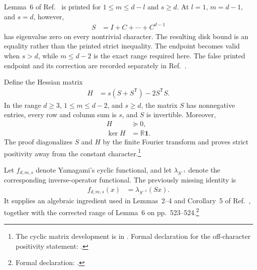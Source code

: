 \documentclass{article}
\begin{document}
Lemma~6 of Ref.~\cite[pp.~523--524]{Yamagami1993Cyclic} is printed for
$1\leq m\leq d-l$ and $s\geq d$. At $l=1$, $m=d-1$, and $s=d$, however,
\begin{align}
    S
        &=I+C+\cdots+C^{d-1}
    \label{eq:wolf_ex3_1_choi_positivity_subcase_scope_false_endpoint_matrix}
\end{align}
has eigenvalue zero on every nontrivial character. The resulting disk bound is
an equality rather than the printed strict inequality. The endpoint becomes
valid when $s>d$, while $m\leq d-2$ is the exact range required here. The
false printed endpoint and its correction are recorded separately in
Ref.~\cite{gap:yamagami_lemma6_endpoint}.

Define the Hessian matrix
\begin{align}
    H
        &=s(S+S^{\mathsf T})-2S^{\mathsf T}S.
    \label{eq:wolf_ex3_1_choi_positivity_subcase_scope_hessian_matrix}
\end{align}
In the range $d\geq 3$, $1\leq m\leq d-2$, and $s\geq d$, the matrix $S$ has
nonnegative entries, every row and column sum is $s$, and $S$ is invertible.
Moreover,
\begin{align}
    H
        &\succeq 0,
    \label{eq:wolf_ex3_1_choi_positivity_subcase_scope_hessian_positive}\\
    \ker H
        &=\mathbb R\mathbf 1.
    \label{eq:wolf_ex3_1_choi_positivity_subcase_scope_hessian_kernel}
\end{align}
The proof diagonalizes $S$ and $H$ by the finite Fourier transform and proves
strict positivity away from the constant character.\footnote{The cyclic
matrix development is in
. Formal declaration for the
off-character positivity statement:
.}

Let $f_{d,m,s}$ denote Yamagami's cyclic functional, and let
$\lambda_{S^{-1}}$ denote the corresponding inverse-operator functional. The
previously missing identity is
\begin{align}
    f_{d,m,s}(x)
        &=\lambda_{S^{-1}}(Sx).
    \label{eq:wolf_ex3_1_choi_positivity_subcase_scope_inverse_operator_identity}
\end{align}
It supplies an algebraic ingredient used in Lemmas~2--4 and Corollary~5 of
Ref.~\cite[pp.~522--523]{Yamagami1993Cyclic}, together with the corrected
range of Lemma~6 on pp.~523--524.\footnote{Formal declaration:
.}
\end{document}
